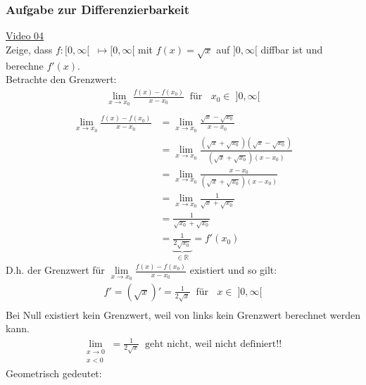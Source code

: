 \subsubsection{Aufgabe zur Differenzierbarkeit}
\href{https://youtu.be/xyC4rGxDFrM}{Video 04}\\
Zeige, dass $ f:[0,\infty[ \;\;\longmapsto[0,\infty[$ mit $ f(x)=\sqrt{x} $ auf $ ]0,\infty[ $ diffbar ist und berechne $ f'(x) $.\vspace*{2mm}\\
Betrachte den Grenzwert: \\
\begin{align*}
\lim\limits_ {x\to x_0}\frac{f(x)-f(x_0)}{x-x_0}\;\;\text{für }\;\; x_0\in \;]0,\infty[ \\
\end{align*}
\begin{align*}
\lim\limits_ {x\to x_0}\frac{f(x)-f(x_0)}{x-x_0} &=\lim\limits_ {x\to x_0}\frac{\sqrt{x}-\sqrt{x_0}}{x-x_0}\\
&=\lim\limits_ {x\to x_0}\frac{(\sqrt{x}+\sqrt{x_0})(\sqrt{x}-\sqrt{x_0})}{(\sqrt{x}+\sqrt{x_0})(x-x_0)}\\
&=\lim\limits_ {x\to x_0}\frac{x-x_0}{(\sqrt{x}+\sqrt{x_0})(x-x_0)}\\
&=\lim\limits_ {x\to x_0}\frac{1}{\sqrt{x}+\sqrt{x_0}}\\
&=\frac{1}{\sqrt{x_0}+\sqrt{x_0}}\\
&=\underbrace{\frac{1}{2\sqrt{x_0}}}_{\in \mathbb{R}}=f'(x_0)
\end{align*}
D.h. der Grenzwert für $\lim\limits_ {x\to x_0}\frac{f(x)-f(x_0)}{x-x_0}  $ existiert und so gilt:\\
\begin{align*}
f'=(\sqrt{x})'=\frac{1}{2\sqrt{x}}\;\;\text{für }\;\; x\in \;]0,\infty[\\
\end{align*}
Bei Null existiert kein Grenzwert, weil von links kein Grenzwert berechnet werden kann.\\
\begin{align*}
\lim\limits_ {\substack{x \to 0 \\ x<0}}=\frac{1}{2\sqrt{x}}\;\;\text{geht nicht, weil nicht definiert!! }
\end{align*}
Geometrisch gedeutet:\\
